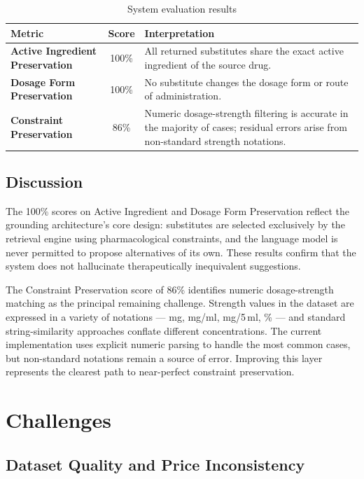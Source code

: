 \documentclass[12pt,a4paper]{article}
\begin{document}
\begin{table}[H]
\centering
\caption{System evaluation results}
\label{tab:metrics}
\renewcommand{\arraystretch}{1.4}
\begin{tabularx}{\textwidth}{>{\bfseries}p{5cm} c X}
\toprule
Metric & Score & Interpretation \\
\midrule
Active Ingredient Preservation &
    100\% &
    All returned substitutes share the exact active ingredient of the
    source drug. \\
Dosage Form Preservation &
    100\% &
    No substitute changes the dosage form or route of administration. \\
Constraint Preservation &
    86\% &
    Numeric dosage-strength filtering is accurate in the majority of
    cases; residual errors arise from non-standard strength notations. \\
\bottomrule
\end{tabularx}
\end{table}

\subsection{Discussion}

The 100\% scores on Active Ingredient and Dosage Form Preservation reflect
the grounding architecture's core design: substitutes are selected exclusively
by the retrieval engine using pharmacological constraints, and the language
model is never permitted to propose alternatives of its own. These results
confirm that the system does not hallucinate therapeutically inequivalent
suggestions.

The Constraint Preservation score of 86\% identifies numeric dosage-strength
matching as the principal remaining challenge. Strength values in the dataset
are expressed in a variety of notations --- mg, mg/ml, mg/5\,ml, \% --- and
standard string-similarity approaches conflate different concentrations.
The current implementation uses explicit numeric parsing to handle the most
common cases, but non-standard notations remain a source of error. Improving
this layer represents the clearest path to near-perfect constraint preservation.

\section{Challenges}

\subsection{Dataset Quality and Price Inconsistency}
\end{document}
